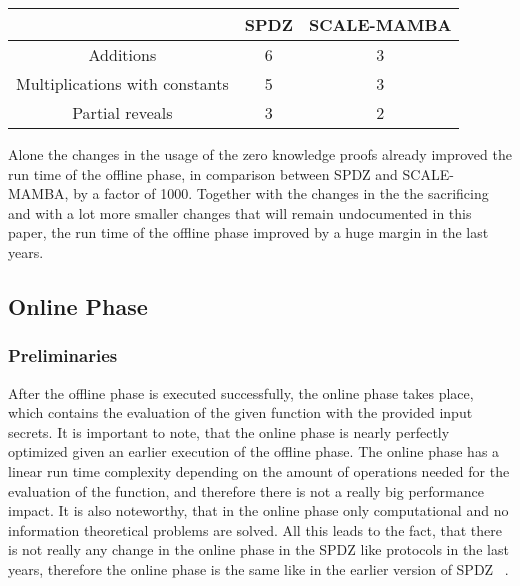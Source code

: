 \documentclass[english,runningheads,a4paper]{llncs}[2018/03/10]
\begin{document}
\begin{center}
\begin{tabular}{ | c | c | c | }
\hline
& SPDZ & SCALE-MAMBA \\
\hline
 Additions & 6 & 3 \\ 
\hline
 Multiplications with constants & 5 & 3 \\  
\hline
Partial reveals & 3 &2 \\
\hline
\end{tabular}
\end{center}

Alone the changes in the usage of the zero knowledge proofs already improved the run time of the offline phase, in comparison between SPDZ and SCALE-MAMBA, by a factor of 1000. Together with the changes in the the sacrificing and with a lot more smaller changes that will remain undocumented in this paper, the run time of the offline phase improved by a huge margin in the last years.

\subsection{Online Phase}

\subsubsection{Preliminaries}

After the offline phase is executed successfully, the online phase takes place, which contains the evaluation of the given function with the provided input secrets.
It is important to note, that the online phase is nearly perfectly optimized given an earlier execution of the offline phase. The online phase has a linear run time complexity depending on the amount of operations needed for the evaluation of the function, and therefore there is not a really big performance impact. It is also noteworthy, that in the online phase only computational and no information theoretical problems are solved. All this leads to the fact, that there is not really any change in the online phase in the SPDZ like protocols in the last years, therefore the online phase is the same like in the earlier version of SPDZ  ~\cite{cryptoeprint:2011:535}.
\end{document}
